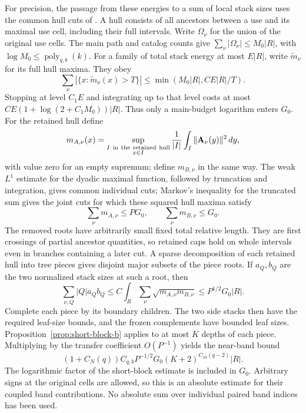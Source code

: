 For precision, the passage from these energies to a sum of local
stack sizes uses the common hull cuts of \cite[Section~7]{H}.
A hull consists of all ancestors between a use and its maximal use
cell, including their full intervals.  Write \(\Omega_\nu\) for
the union of the original use cells.  The main path and catalog
counts give
\(\sum_\nu|\Omega_\nu|\le M_0|R|\), with
\(\log M_0\le\operatorname{poly}_{q,b}(k)\).
For a family of total stack energy at most \(E|R|\), write
\(\widetilde m_\nu\) for its full hull maxima.  They obey
\[
 \sum_\nu|\{x:\widetilde m_\nu(x)>T\}|
       \le\min(M_0|R|,CE|R|/T).
\]
Stopping at level \(C_1E\) and integrating up to that level costs
at most \(CE(1+\log(2+C_1M_0))|R|\).  Thus only a main-budget
logarithm enters \(G_0\).
For the retained hull define
\[
 m_{A,\nu}(x)=
 \sup_{\substack{I\ {\rm in\ the\ retained\ hull}\\x\in I}}
              \frac1{|I|}\int_I\|\mathbf A_\nu(y)\|^2\,dy,
\]
with value zero for an empty supremum; define \(m_{B,\nu}\) in
the same way.  The weak \(L^1\) estimate for the dyadic maximal
function, followed by truncation and integration, gives common
individual cuts; Markov's inequality for the truncated sum gives
the joint cuts for which these squared hull maxima satisfy
\[
 \sum_\nu m_{A,\nu}\le PG_0,\qquad
 \sum_\nu m_{B,\nu}\le G_0.
\]
The removed roots have arbitrarily small fixed total relative length.
They are first crossings of partial ancestor quantities, so retained
caps hold on whole intervals even in branches containing a later cut.
A sparse decomposition of each retained hull into tree pieces gives
disjoint major subsets of the piece roots.  If \(a_Q,b_Q\) are the
two normalized stack sizes at such a root, then
\[
 \sum_{\nu,Q}|Q|a_Qb_Q
 \le C\int_R\sum_\nu\sqrt{m_{A,\nu}m_{B,\nu}}
 \le P^{1/2}G_0|R|.
\]
Complete each piece by its boundary children.  The two side stacks
then have the required leaf-size bounds, and the frozen complements
have bounded leaf sizes.  Proposition~\ref{prop:short-block-b}
applies to at most \(K\) depths of each piece.  Multiplying by the
transfer coefficient \(O(P^{-1})\) yields the near-band bound
\begin{equation}\label{eq:near-band-b}
 (1+C_N(q))C_{q,b}P^{-1/2}G_0
                    (K+2)^{C_{19}(q-2)}|R|.
\end{equation}
The logarithmic factor of the short-block estimate is included in
\(G_0\).  Arbitrary signs at the original cells are allowed, so this
is an absolute estimate for their coupled band contributions.
No absolute sum over individual paired band indices has been used.

